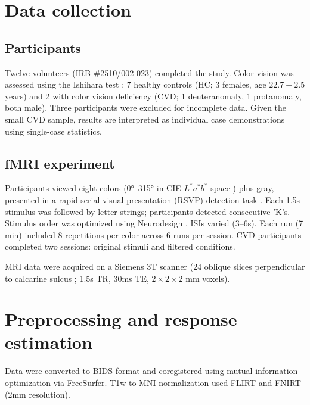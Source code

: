 
\section{Data collection}

\subsection*{Participants}

Twelve volunteers (IRB \#2510/002-023) completed the study. Color vision was assessed using the Ishihara test \cite{ishihara1917}: 7 healthy controls (HC; 3 females, age $22.7 \pm 2.5$ years) and 2 with color vision deficiency (CVD; 1 deuteranomaly, 1 protanomaly, both male). Three participants were excluded for incomplete data. Given the small CVD sample, results are interpreted as individual case demonstrations using \textcite{crawford1998} single-case statistics.

\subsection*{fMRI experiment}

Participants viewed eight colors (0°--315° in CIE $L^*a^*b^*$ space \cite{cie1986}) plus gray, presented in a rapid serial visual presentation (RSVP) detection task \cite{brouwer2009}. Each 1.5s stimulus was followed by letter strings; participants detected consecutive 'K's. Stimulus order was optimized using Neurodesign \cite{durnez2018}. ISIs varied (3--6s). Each run (7 min) included 8 repetitions per color across 6 runs per session. CVD participants completed two sessions: original stimuli and filtered conditions.

MRI data were acquired on a Siemens 3T scanner (24 oblique slices perpendicular to calcarine sulcus \cite{ryu2024}; 1.5s TR, 30ms TE, $2 \times 2 \times 2$ mm voxels).

\section{Preprocessing and response estimation}

Data were converted to BIDS format \cite{levitas2024} and coregistered using mutual information optimization \cite{maes1997, wells1996} via FreeSurfer. T1w-to-MNI normalization used FLIRT \cite{jenkinson2002} and FNIRT \cite{andersson2007} (2mm resolution).

